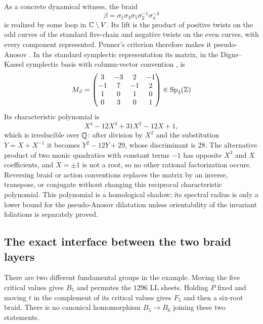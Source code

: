 As a concrete dynamical witness, the braid
\begin{equation}
 \beta=\sigma_1\sigma_3\sigma_5\sigma_2^{-1}\sigma_4^{-3}
 \label{eq:sextic-penner-witness-braid}
\end{equation}
is realized by some loop in $\mathbb{C}\setminus V$.  Its lift is the product of
positive twists on the odd curves of the standard five-chain and negative
twists on the even curves, with every component represented.  Penner's
criterion therefore makes it pseudo-Anosov
\cite{Penner1988PseudoAnosov}.  In the standard symplectic representation its
matrix, in the Digne--Kassel symplectic basis with column-vector convention
\cite{DigneKassel2023SymplecticSteinberg}, is
\begin{equation}
 M_\beta=
 \begin{pmatrix}
 3&-3&2&-1\\
 -1&7&-1&2\\
 1&0&1&0\\
 0&3&0&1
 \end{pmatrix}
 \in\operatorname{Sp}_4(\mathbb{Z})
 \label{eq:sextic-penner-homological-matrix}
\end{equation}
Its characteristic polynomial is
\begin{equation}
 X^4-12X^3+31X^2-12X+1,
 \label{eq:sextic-penner-homological-polynomial}
\end{equation}
which is irreducible over $\mathbb{Q}$: after division by $X^2$ and the substitution
$Y=X+X^{-1}$ it becomes $Y^2-12Y+29$, whose discriminant is $28$.
The alternative product of two monic quadratics with constant terms $-1$
has opposite $X^3$ and $X$ coefficients, and $X=\pm1$ is not a root, so no
other rational factorization occurs.
Reversing braid or action conventions replaces the matrix by an inverse,
transpose, or conjugate without changing this reciprocal characteristic
polynomial.  This polynomial is a homological shadow; its
spectral radius is only a lower bound for the pseudo-Anosov dilatation unless
orientability of the invariant foliations is separately proved.

\subsection{The exact interface between the two braid layers}

There are two different fundamental groups in the example.  Moving the five
critical values gives $B_5$ and permutes the $1296$ LL sheets.  Holding $P$
fixed and moving $t$ in the complement of its critical values gives $F_5$ and
then a six-root braid.  There is no canonical homomorphism $B_5\to B_6$ joining
these two statements.


